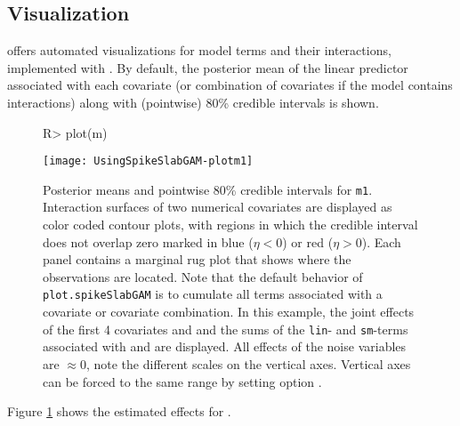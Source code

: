 \documentclass[article, shortnames, nojss, noheadings, notitle]{jss}
\begin{document}
\subsection{Visualization}\label{visualization}
 offers automated visualizations for model terms and their interactions, implemented with
 \citep{ggplot2}.
By default, the posterior mean of the linear predictor associated with each covariate
(or combination of covariates if the model contains interactions) along with (pointwise) 80\%
credible intervals is shown.
\begin{figure}[!htbp]\begin{center}
\tikzset{font=\scriptsize}
\begin{Schunk}
\begin{Sinput}
R> plot(m)
\end{Sinput}
\end{Schunk}
\texttt{[image: UsingSpikeSlabGAM-plotm1]}
\caption{Posterior means and pointwise 80\% credible intervals for \texttt{m1}.
Interaction surfaces of two numerical covariates
are displayed as color coded contour plots, with regions in which the credible interval does not overlap zero marked
in blue ($\eta < 0$) or red ($\eta > 0$). Each panel contains a marginal rug plot that shows where the observations are located.
Note that the default behavior of
\texttt{plot.spikeSlabGAM} is to cumulate all terms associated with a covariate or covariate combination.
In this example, the joint effects of the first 4 covariates  and  and the sums of the
\texttt{lin}- and \texttt{sm}-terms associated with  and 
are displayed. All effects of the noise variables are $\approx 0$, note the different scales on the vertical axes.
Vertical axes can be forced to the same range by setting option .}
\label{fig:m1}
\end{center}\end{figure}
Figure \ref{fig:m1} shows the estimated effects for .
\end{document}
